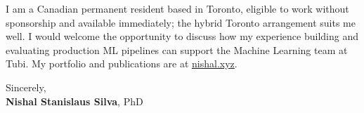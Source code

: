 \documentclass[11pt]{article}
\newcommand{\clName}{Nishal Stanislaus Silva}
\newcommand{\clSite}{https://nishal.xyz}
\newcommand{\clCompany}{Tubi}
\newcommand{\clTeam}{the Machine Learning team}
\begin{document}
I am a Canadian permanent resident based in Toronto, eligible to work without sponsorship and available immediately; the hybrid Toronto arrangement suits me well. I would welcome the opportunity to discuss how my experience building and evaluating production ML pipelines can support \clTeam{} at \clCompany{}. My portfolio and publications are at \href{\clSite}{nishal.xyz}.

\vspace{12pt}
Sincerely,\\[2pt]
\textbf{\clName}, PhD
\end{document}
